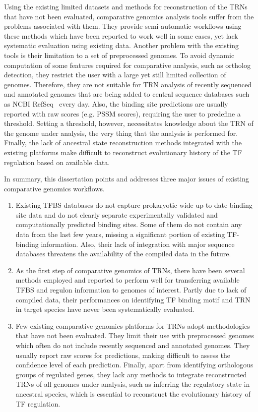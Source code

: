 Using the existing limited datasets and methods for reconstruction of the TRNs
that have not been evaluated, comparative genomics analysis tools suffer from
the problems associated with them. They provide semi-automatic workflows using
these methods which have been reported to work well in some cases, yet lack
systematic evaluation using existing data. Another problem with the existing
tools is their limitation to a set of preprocessed genomes. To avoid dynamic
computation of some features required for comparative analysis, such as
ortholog detection, they restrict the user with a large yet still limited
collection of genomes. Therefore, they are not suitable for TRN analysis of
recently sequenced and annotated genomes that are being added to central
sequence databases such as NCBI RefSeq~\cite{o2015reference} every
day. Also, the binding site predictions are usually reported with raw scores
(e.g. PSSM scores), requiring the user to predefine a threshold. Setting a
threshold, however, necessitates knowledge about the TRN of the genome under
analysis, the very thing that the analysis is performed for. Finally, the lack
of ancestral state reconstruction methods integrated with the existing
platforms make difficult to reconstruct evolutionary history of the TF
regulation based on available data.

In summary, this dissertation points and addresses three major issues of
existing comparative genomics workflows.

\begin{enumerate}
\item Existing TFBS databases do not capture prokaryotic-wide up-to-date
  binding site data and do not clearly separate experimentally validated and
  computationally predicted binding sites. Some of them do not contain any data
  from the last few years, missing a significant portion of existing TF-binding
  information. Also, their lack of integration with major sequence databases
  threatens the availability of the compiled data in the future.

\item As the first step of comparative genomics of TRNs, there have been
  several methods employed and reported to perform well for transferring
  available TFBS and regulon information to genomes of interest. Partly due to
  lack of compiled data, their performances on identifying TF binding motif and
  TRN in target species have never been systematically evaluated.

\item Few existing comparative genomics platforms for TRNs adopt methodologies
  that have not been evaluated. They limit their use with preprocessed genomes
  which often do not include recently sequenced and annotated genomes. They
  usually report raw scores for predictions, making difficult to assess the
  confidence level of each prediction.  Finally, apart from identifying
  orthologous groups of regulated genes, they lack any methods to integrate
  reconstructed TRNs of all genomes under analysis, such as inferring the
  regulatory state in ancestral species, which is essential to reconstruct the
  evolutionary history of TF regulation.
\end{enumerate}

